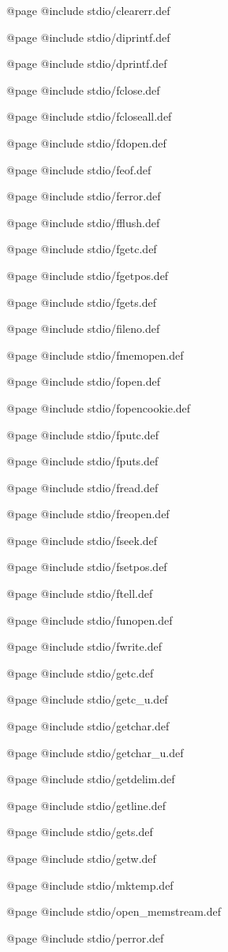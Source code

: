 @page
@include stdio/clearerr.def

@page
@include stdio/diprintf.def

@page
@include stdio/dprintf.def

@page
@include stdio/fclose.def

@page
@include stdio/fcloseall.def

@page
@include stdio/fdopen.def

@page
@include stdio/feof.def

@page
@include stdio/ferror.def

@page
@include stdio/fflush.def

@page
@include stdio/fgetc.def

@page
@include stdio/fgetpos.def

@page
@include stdio/fgets.def

@page
@include stdio/fileno.def

@page
@include stdio/fmemopen.def

@page
@include stdio/fopen.def

@page
@include stdio/fopencookie.def

@page
@include stdio/fputc.def

@page
@include stdio/fputs.def

@page
@include stdio/fread.def

@page
@include stdio/freopen.def

@page
@include stdio/fseek.def

@page
@include stdio/fsetpos.def

@page
@include stdio/ftell.def

@page
@include stdio/funopen.def

@page
@include stdio/fwrite.def

@page
@include stdio/getc.def

@page
@include stdio/getc_u.def

@page
@include stdio/getchar.def

@page
@include stdio/getchar_u.def

@page
@include stdio/getdelim.def

@page
@include stdio/getline.def

@page
@include stdio/gets.def

@page
@include stdio/getw.def

@page
@include stdio/mktemp.def

@page
@include stdio/open_memstream.def

@page
@include stdio/perror.def

